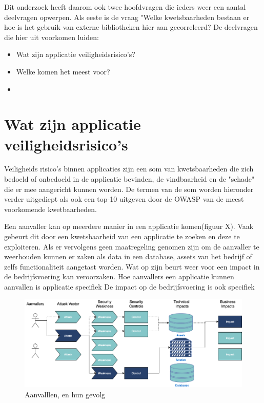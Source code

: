 Dit onderzoek heeft daarom ook twee hoofdvragen die ieders weer een aantal deelvragen opwerpen.
Als eeste is de vraag "Welke kwetsbaarheden bestaan er hoe is het gebruik van externe bibliotheken hier aan gecorreleerd?
De deelvragen die hier uit voorkomen luiden:
\begin{itemize}
    \item Wat zijn applicatie veiligheidsrisico's?
    \item Welke komen het meest voor?
    \item
\end{itemize}

\section{Wat zijn applicatie veiligheidsrisico's}\label{sec:wat-zijn-applicatie-veiligheids-risico's}
Veiligheids risico's binnen applicaties zijn een som van kwetsbaarheden die zich bedoeld of onbedoeld in de applicatie bevinden, de vindbaarheid en de "schade" die er mee aangericht kunnen worden.
De termen van de som worden hieronder verder uitgediept als ook een top-10 uitgeven door de OWASP van de meest voorkomende kwetbaarheden.

Een aanvaller kan op meerdere manier in een applicatie komen(figuur X).
Vaak gebeurt dit door een kwetsbaarheid van een applicatie te zoeken en deze te exploiteren.
Als er vervolgens geen maatregeling genomen zijn om de aanvaller te weerhouden kunnen er zaken als data in een database, assets van het bedrijf of zelfs functionaliteit aangetast worden.
Wat op zijn beurt weer voor een impact in de bedrijfsvoering kan veroorzaken.
Hoe aanvallers een applicatie kunnen aanvallen is applicatie specifiek
De impact op de bedrijfsvoering is ook specifiek
\begin{figure}[H]
    \myfloatalign
    \includegraphics[width=15cm]{gfx/application security routes}
    \caption{Aanvalllen, en hun gevolg}
    \label{fig:Application Security Routes}
\end{figure}


